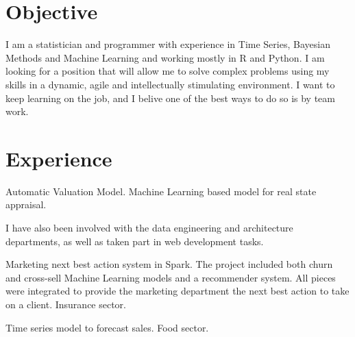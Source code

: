 \documentclass[]{deedy-resume-openfont}
\begin{document}
\begin{minipage}[t]{0.66\textwidth} 


\section{Objective}
I am a statistician and programmer with experience in Time Series, Bayesian Methods and Machine Learning and working
mostly in R and Python.
I am looking for a position that will allow me to solve complex problems using my skills in a dynamic, agile and 
intellectually stimulating environment. I want to keep learning on the job, and I belive one of the best ways
to do so is by team work.  
\sectionsep


\section{Experience}


\vspace{\topsep} %
\begin{tightemize}
\item Automatic Valuation Model. Machine Learning based model for real state appraisal.
\item I have also been involved with the data engineering and architecture departments, 
as well as taken part in web development tasks.
\end{tightemize}
\sectionsep


\vspace{\topsep} %
\begin{tightemize}
\item Marketing next best action system in Spark. The project included both churn and cross-sell Machine Learning
models and a recommender system. All pieces were integrated to provide the marketing department the next
best action to take on a client.
Insurance sector.
\item Time series model to forecast sales. Food sector.
\end{tightemize}
\sectionsep


\end{minipage}
\end{document}
